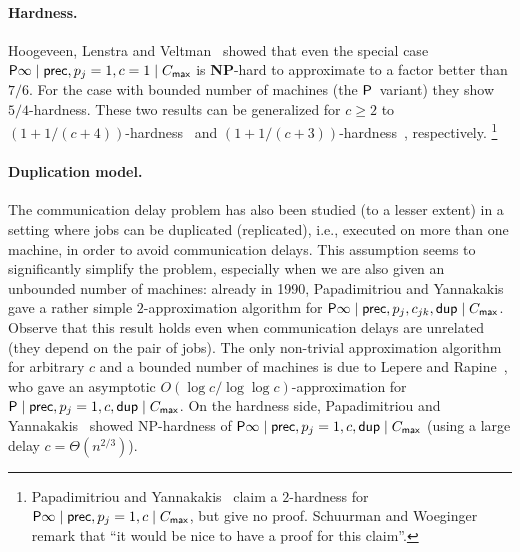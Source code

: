 \paragraph{Hardness.}
Hoogeveen, Lenstra and Veltman~\cite{HoogeveenLV94} showed that even the special case $\mathsf{P} \infty \mid \mathsf{prec}, p_j=1, c=1 \mid C_{\mathsf{max}}$ is \textbf{NP}-hard to approximate to a factor  better than $7/6$.
For the case with bounded number of machines (the $\mathsf{P}$~variant)
they show $5/4$-hardness.
These two results can be generalized for $c \ge 2$ to $(1+1/(c+4))$-hardness~\cite{GiroudeauKMP08}
and $(1+1/(c+3))$-hardness~\cite{BampisGK96},
respectively.%
\footnote{
	Papadimitriou and Yannakakis~\cite{PapadimitriouY90} claim a $2$-hardness for
	$\mathsf{P} \infty \mid \mathsf{prec}, p_j=1, c \mid C_{\mathsf{max}}$,
	but give no proof.
	Schuurman and Woeginger~\cite{SW99a} remark that ``it would be nice to have a proof for this claim''.
}


\paragraph{Duplication model.}
The communication delay problem has also been studied (to a lesser extent) in a setting where jobs can be duplicated (replicated), i.e., executed on more than one machine, in order to avoid communication delays.
This assumption seems to significantly simplify the problem,
especially when we are also given an unbounded number of machines:
already in 1990,
Papadimitriou and Yannakakis~\cite{PapadimitriouY90} gave a rather simple $2$-approximation algorithm for $\mathsf{P} \infty \mid \mathsf{prec}, p_j, c_{jk}, \mathsf{dup} \mid C_{\mathsf{max}}$.
Observe that this result holds even when communication delays are unrelated (they depend on the pair of jobs).
The only non-trivial approximation algorithm for arbitrary $c$ and a bounded number of machines is due to Lepere and Rapine~\cite{LepereR02}, who gave an asymptotic $O(\log c / \log \log c)$-approximation for $\mathsf{P} \mid \mathsf{prec}, p_j=1, c, \mathsf{dup} \mid C_{\mathsf{max}}$.
On the hardness side,
Papadimitriou and Yannakakis~\cite{PapadimitriouY90}
showed NP-hardness of
$\mathsf{P} \infty \mid \mathsf{prec}, p_j=1, c, \mathsf{dup} \mid C_{\mathsf{max}}$
(using a large delay $c = \Theta(n^{2/3})$).

